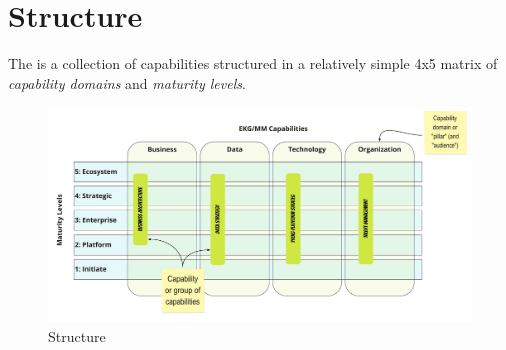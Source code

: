 \chapter{Structure}\label{ch:ekg-mm-structure}

The  is a collection of capabilities structured in a relatively simple 4x5 matrix of
\textit{capability domains} and \textit{maturity levels}.

\begin{figure}[ht]
    \centering
    \includegraphics[width=\textwidth]{../images/ekg-mm-structure.pdf}
    \caption{ Structure}
    \label{fig:ekg-mm-structure}
\end{figure}












